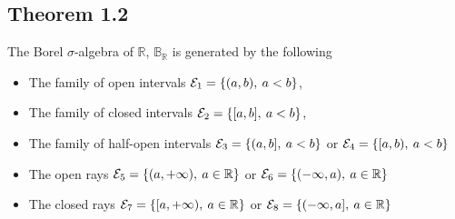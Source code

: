 \documentclass[../../main.tex]{subfiles}
\begin{document}
\subsection{Theorem 1.2}
\newcommand{\borel}{\mathbb{B}_{\mathbb{R}}}
\newcommand{\gen}[1]{\mathcal{M}(\mathcal{E}_{#1})}
\begin{wts}
    The Borel $\sigma$-algebra of $\mathbb{R}$, $\borel$ is generated by the following
    \begin{itemize}
        \item The family of open intervals $\cal{E}_1=\{(a,b),\:a<b\}$,
        \item The family of closed intervals $\cal{E}_2=\{[a,b],\:a<b\}$,
        \item The family of half-open intervals $\cal{E}_3=\{(a,b],\:a<b\}$ or $\cal{E}_4=\{[a,b),\:a<b\}$
        \item The open rays $\cal{E}_5=\{(a,+\infty),\:a\in\mathbb{R}\}$ or $\cal{E}_6=\{(-\infty,a),\:a\in\mathbb{R}\}$
        \item The closed rays
        $\cal{E}_7=\{[a,+\infty),\:a\in\mathbb{R}\}$ or
        $\cal{E}_8=\{(-\infty,a],\:a\in\mathbb{R}\}$
    \end{itemize}
\end{wts}
\end{document}
